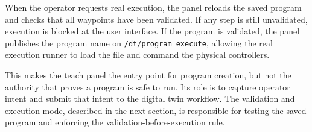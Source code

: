 When the operator requests real execution, the panel reloads the saved program and checks that all waypoints have been validated. If any step is still unvalidated, execution is blocked at the user interface. If the program is validated, the panel publishes the program name on \texttt{/dt/program\_execute}, allowing the real execution runner to load the file and command the physical controllers.

This makes the teach panel the entry point for program creation, but not the authority that proves a program is safe to run. Its role is to capture operator intent and submit that intent to the digital twin workflow. The validation and execution mode, described in the next section, is responsible for testing the saved program and enforcing the validation-before-execution rule.
